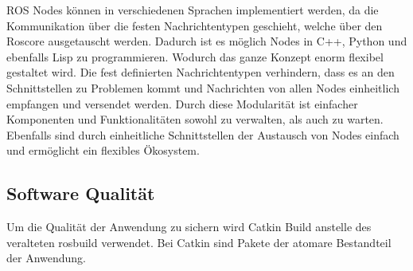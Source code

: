 \newline
ROS Nodes können in verschiedenen Sprachen implementiert werden, da die Kommunikation über die festen Nachrichtentypen geschieht, welche über den Roscore ausgetauscht werden. Dadurch ist es möglich Nodes in C++, Python und ebenfalls Lisp zu programmieren. Wodurch das ganze Konzept enorm flexibel gestaltet wird. Die fest definierten Nachrichtentypen verhindern, dass es an den Schnittstellen zu Problemen kommt und Nachrichten von allen Nodes einheitlich empfangen und versendet werden. \newline
Durch diese Modularität ist einfacher Komponenten und Funktionalitäten sowohl zu verwalten, als auch zu warten. Ebenfalls sind durch einheitliche Schnittstellen der Austausch von Nodes einfach und ermöglicht ein flexibles Ökosystem.


\subsection{Software Qualität}
Um die Qualität der Anwendung zu sichern wird Catkin Build anstelle des veralteten rosbuild verwendet. Bei Catkin sind Pakete der atomare Bestandteil der Anwendung.

